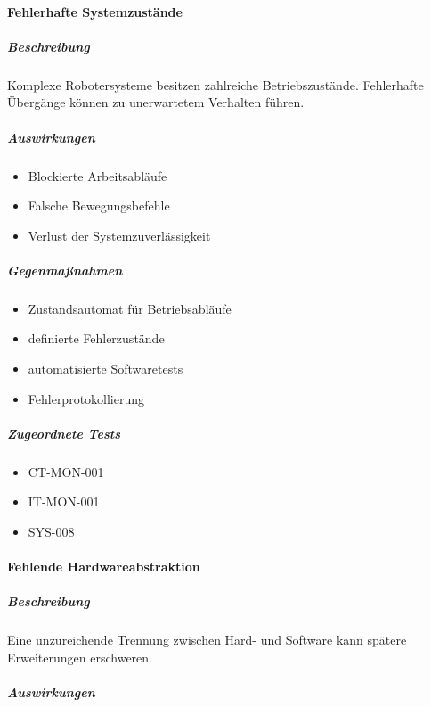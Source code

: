 \paragraph{Fehlerhafte
Systemzustände}\label{fehlerhafte-systemzustuxe4nde}

\subparagraph{Beschreibung}\label{beschreibung-3}

Komplexe Robotersysteme besitzen zahlreiche Betriebszustände.
Fehlerhafte Übergänge können zu unerwartetem Verhalten führen.

\subparagraph{Auswirkungen}\label{auswirkungen-3}

\begin{itemize}
\tightlist
\item
  Blockierte Arbeitsabläufe
\item
  Falsche Bewegungsbefehle
\item
  Verlust der Systemzuverlässigkeit
\end{itemize}

\subparagraph{Gegenmaßnahmen}\label{gegenmauxdfnahmen-2}

\begin{itemize}
\tightlist
\item
  Zustandsautomat für Betriebsabläufe
\item
  definierte Fehlerzustände
\item
  automatisierte Softwaretests
\item
  Fehlerprotokollierung
\end{itemize}

\subparagraph{Zugeordnete Tests}\label{zugeordnete-tests-2}

\begin{itemize}
\tightlist
\item
  CT-MON-001
\item
  IT-MON-001
\item
  SYS-008
\end{itemize}

\paragraph{Fehlende
Hardwareabstraktion}\label{fehlende-hardwareabstraktion}

\subparagraph{Beschreibung}\label{beschreibung-4}

Eine unzureichende Trennung zwischen Hard- und Software kann spätere
Erweiterungen erschweren.

\subparagraph{Auswirkungen}\label{auswirkungen-4}

